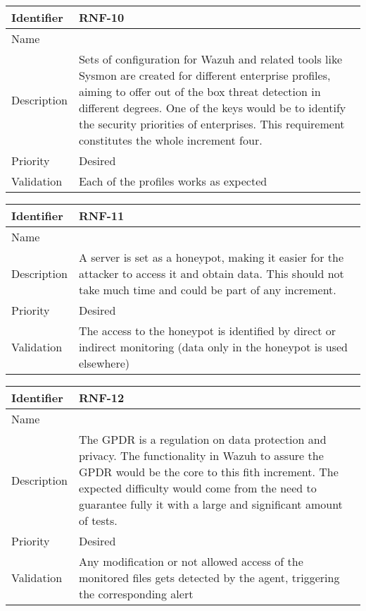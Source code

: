 \begin{table}[H]
	\begin{tabularx}{\textwidth}{|l|X|}
		\hline
		\rowcolor{gray!30}
		Identifier & \textbf{RNF-10} \\ \hline
		Name & \RNFdiez \\ \hline
		Description & Sets of configuration for Wazuh and related tools like Sysmon are created for different enterprise profiles, aiming to offer out of the box threat detection in different degrees. One of the keys would be to identify the security priorities of enterprises. This requirement constitutes the whole increment four. \\ \hline
		Priority & Desired \\ \hline
		Validation & Each of the profiles works as expected \\ \hline
	\end{tabularx}
\end{table}
\begin{table}[H]
	\begin{tabularx}{\textwidth}{|l|X|}
		\hline
		\rowcolor{gray!30}
		Identifier & \textbf{RNF-11} \\ \hline
		Name & \RNFonce \\ \hline
		Description & A server is set as a honeypot, making it easier for the attacker to access it and obtain data. This should not take much time and could be part of any increment. \\ \hline
		Priority & Desired \\ \hline
		Validation & The access to the honeypot is identified by direct or indirect monitoring (data only in the honeypot is used elsewhere) \\ \hline
	\end{tabularx}
\end{table}
\begin{table}[H]
	\begin{tabularx}{\textwidth}{|l|X|}
		\hline
		\rowcolor{gray!30}
		Identifier & \textbf{RNF-12} \\ \hline
		Name & \RNFdoce \\ \hline
		Description & The GPDR is a regulation on data protection and privacy. The functionality in Wazuh to assure the GPDR would be the core to this fith increment. The expected difficulty would come from the need to guarantee fully it with a large and significant amount of tests.  \\ \hline
		Priority & Desired \\ \hline
		Validation & Any modification or not allowed access of the monitored files gets detected by the agent, triggering the corresponding alert \\ \hline
	\end{tabularx}
\end{table}
